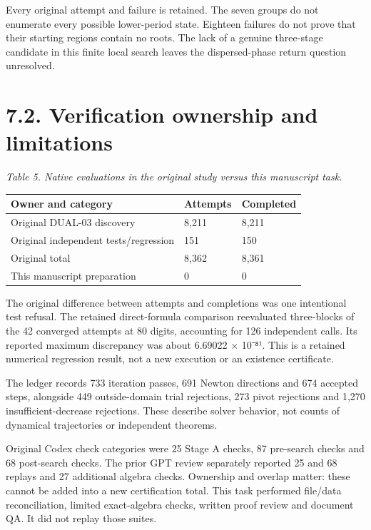 \documentclass[11pt,a4paper]{article}
\begin{document}
Every original attempt and failure is retained. The seven groups do not enumerate every possible lower-period state. Eighteen failures do not prove that their starting regions contain no roots. The lack of a genuine three-stage candidate in this finite local search leaves the dispersed-phase return question unresolved.

\clearpage
\section*{7.2. Verification ownership and limitations}
\par\textit{Table 5. Native evaluations in the original study versus this manuscript task.}
\begingroup\small
\begin{tabularx}{\textwidth}{XXX}
\toprule
Owner and category & Attempts & Completed\\\midrule
Original DUAL-03 discovery & 8,211 & 8,211\\
Original independent tests/regression & 151 & 150\\
Original total & 8,362 & 8,361\\
This manuscript preparation & 0 & 0\\
\bottomrule\end{tabularx}\endgroup\par
The original difference between attempts and completions was one intentional test refusal. The retained direct-formula comparison reevaluated three-blocks of the 42 converged attempts at 80 digits, accounting for 126 independent calls. Its reported maximum discrepancy was about 6.69022 × 10⁻⁸¹. This is a retained numerical regression result, not a new execution or an existence certificate. \cite{D03}

The ledger records 733 iteration passes, 691 Newton directions and 674 accepted steps, alongside 449 outside-domain trial rejections, 273 pivot rejections and 1,270 insufficient-decrease rejections. These describe solver behavior, not counts of dynamical trajectories or independent theorems.

Original Codex check categories were 25 Stage A checks, 87 pre-search checks and 68 post-search checks. The prior GPT review separately reported 25 and 68 replays and 27 additional algebra checks. Ownership and overlap matter: these cannot be added into a new certification total. This task performed file/data reconciliation, limited exact-algebra checks, written proof review and document QA. It did not replay those suites. \cite{REV03}
\end{document}
